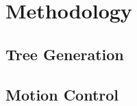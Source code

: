 \chapter{Methodology} %
\label{chapter:methodology}

\section{Tree Generation}
\label{section:tree-generation}
\lipsum

\section{Motion Control}
\label{section:motion-control}
\lipsum

